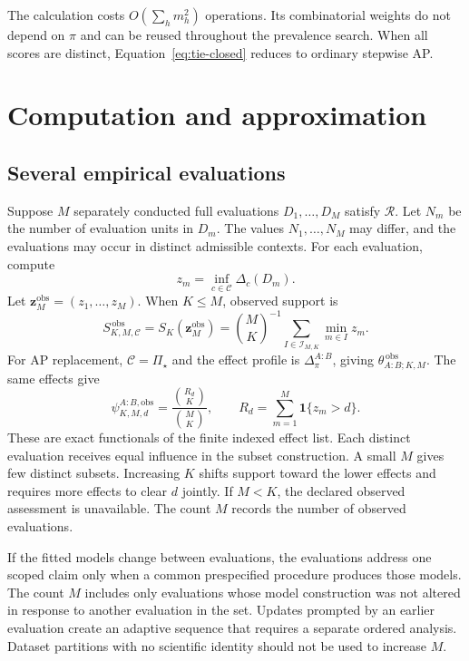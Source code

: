 \documentclass[11pt]{article}
\newcommand{\Regime}{\mathcal{R}}
\newcommand{\CSet}{\mathcal{C}}
\newcommand{\PSet}{\Pi_\star}
\theoremstyle{remark}
\begin{document}
The calculation costs $O(\sum_hm_h^2)$ operations. Its combinatorial weights do not depend on $\pi$ and can be reused throughout the prevalence search. When all scores are distinct, Equation~\eqref{eq:tie-closed} reduces to ordinary stepwise AP.

\section{Computation and approximation}
\label{app:computation}

\subsection{Several empirical evaluations}
\label{app:empirical-evaluations}

Suppose $M$ separately conducted full evaluations $D_1,\ldots,D_M$ satisfy $\Regime$. Let $N_m$ be the number of evaluation units in $D_m$. The values $N_1,\ldots,N_M$ may differ, and the evaluations may occur in distinct admissible contexts. For each evaluation, compute
\[
z_m
=
\inf_{c\in\CSet}\Delta_c(D_m).
\]
Let $\mathbf z_M^{\mathrm{obs}}=(z_1,\ldots,z_M)$. When $K\leq M$,
observed support is
\begin{equation}
S_{K,M,\CSet}^{\,\mathrm{obs}}
=
S_K(\mathbf z_M^{\mathrm{obs}})
=
\binom{M}{K}^{-1}
\sum_{I\in\mathcal I_{M,K}}
\min_{m\in I}z_m.
\label{eq:observed-empirical-support}
\end{equation}
For AP replacement, $\CSet=\PSet$ and the effect profile is $\Delta^{A:B}_\pi$, giving $\theta_{A:B;K,M}^{\,\mathrm{obs}}$. The same effects give
\begin{equation}
\psi_{K,M,d}^{A:B,\mathrm{obs}}
=
\frac{\binom{R_d}{K}}{\binom{M}{K}},
\qquad
R_d=\sum_{m=1}^M\mathbf 1\{z_m>d\}.
\label{eq:literal-survival-estimator}
\end{equation}
These are exact functionals of the finite indexed effect list. Each distinct
evaluation receives equal influence in the subset construction. A small $M$
gives few distinct subsets. Increasing $K$ shifts support toward the lower
effects and requires more effects to clear $d$ jointly. If $M<K$, the declared
observed assessment is unavailable. The count $M$ records the number of
observed evaluations.

If the fitted models change between evaluations, the evaluations address one scoped claim only when a common prespecified procedure produces those models. The count $M$ includes only evaluations whose model construction was not altered in response to another evaluation in the set. Updates prompted by an earlier evaluation create an adaptive sequence that requires a separate ordered analysis. Dataset partitions with no scientific identity should not be used to increase $M$.
\end{document}
